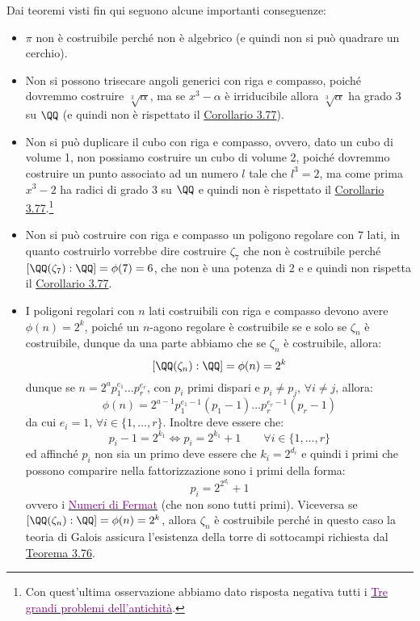 \documentclass[11pt]{scrartcl}
\begin{document}
\begin{remark}
    Dai teoremi visti fin qui seguono alcune importanti conseguenze:
    \begin{itemize}
        \item $\pi$ non è costruibile perché non è algebrico (e quindi non si può quadrare un cerchio).
        \item Non si possono trisecare angoli generici con riga e compasso, poiché dovremmo costruire $\sqrt[3]{\alpha}$, ma se $x^3 - \alpha$ è irriducibile
        allora $\sqrt[3]{\alpha}$ ha grado 3 su $\QQ$ (e quindi non è rispettato il \hyperref[3.77]{Corollario 3.77}).
        \item Non si può duplicare il cubo con riga e compasso, ovvero, dato un cubo di volume 1, non possiamo costruire un cubo di volume 2, poiché dovremmo
        costruire un punto associato ad un numero $l$ tale che $l^3 = 2$, ma come prima $x^3-2$ ha radici di grado 3 su $\QQ$ e quindi non è rispettato il \hyperref[3.77]{Corollario 3.77}.\footnote{Con
        quest'ultima osservazione abbiamo dato risposta negativa tutti i \href{https://it.wikipedia.org/wiki/Tre_grandi_problemi_dell\%27antichit\%C3\%A0}{\textcolor{purple}{Tre grandi problemi dell'antichità}}.}
        \item Non si può costruire con riga e compasso un poligono regolare con 7 lati, in quanto costruirlo vorrebbe dire costruire $\zeta_7$ che non è costruibile perché $[\QQ(\zeta_7) : \QQ] = \phi(7) = 6$,
        che non è una potenza di 2 e e quindi non rispetta il \hyperref[3.77]{Corollario 3.77}.
        \item I poligoni regolari con $n$ lati costruibili con riga e compasso devono avere $\phi(n) = 2^k$, poiché un $n$-agono regolare è costruibile se e solo se $\zeta_n$ è costruibile, dunque da una parte abbiamo che se $\zeta_n$ è costruibile, allora:
        \[ [\QQ(\zeta_n) : \QQ] = \phi(n) = 2^k
            \]
        dunque se $n = 2^a p_1^{e_1}\ldots p_r^{e_r}$, con $p_i$ primi dispari e $p_i \ne p_j$, $\forall i \ne j$, allora:
        \[ \phi(n) = 2^{a-1}p_1^{e_1-1}(p_1 - 1)\ldots p_r^{e_r-1}(p_r - 1)
            \]
        da cui $e_i = 1$, $\forall i \in \{1,\ldots,r\}$. Inoltre deve essere che:
        \[ p_i - 1 = 2^{k_1} \iff p_i = 2^{k_1} + 1 \qquad \forall i \in \{1,\ldots,r\}
            \]
        ed affinché $p_i$ non sia un primo deve essere che $k_i = 2^{d_i}$ e quindi i primi che possono comparire nella fattorizzazione sono i primi della forma:
        \[ p_i = 2^{2^{d_i}} + 1
            \]
        ovvero i \href{https://it.wikipedia.org/wiki/Numero_di_Fermat}{\textcolor{purple}{Numeri di Fermat}} (che non sono tutti primi). Viceversa se $[\QQ(\zeta_n) : \QQ] = \phi(n) = 2^k$, allora $\zeta_n$ è costruibile perché in questo caso 
        la teoria di Galois assicura l'esistenza della torre di sottocampi richiesta dal \hyperref[3.76]{Teorema 3.76}.
    \end{itemize}
\end{remark}
\end{document}
